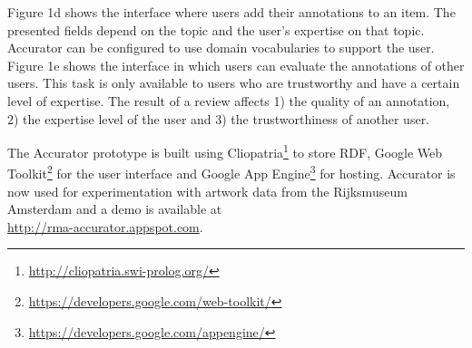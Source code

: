 Figure 1d shows the interface where users add their annotations to an item. The presented fields depend on the topic and the user's expertise on that topic. 
Accurator can be configured to use domain vocabularies to support the user. Figure 1e shows the interface in which users can evaluate the annotations of other users. This task is only available to users who are trustworthy and have a certain level of expertise. The result of a review affects 1) the quality of an annotation, 2) the expertise level of the user and 3) the trustworthiness of another user.

The Accurator prototype is built using Cliopatria\footnote{\url{http://cliopatria.swi-prolog.org/}} to store RDF, Google Web Toolkit\footnote{\url{https://developers.google.com/web-toolkit/}} for the user interface and Google App Engine\footnote{\url{https://developers.google.com/appengine/}}  for hosting. Accurator is now used for experimentation with artwork data from the Rijksmuseum Amsterdam and a demo is available at 
\\ \url{http://rma-accurator.appspot.com}.



